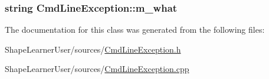 \subsubsection[{m\+\_\+what}]{\setlength{\rightskip}{0pt plus 5cm}string Cmd\+Line\+Exception\+::m\+\_\+what\hspace{0.3cm}{\ttfamily [private]}}\label{class_cmd_line_exception_a7b2c261df1b39eeda27b8ecda39aedb9}


The documentation for this class was generated from the following files\+:\begin{DoxyCompactItemize}
\item 
Shape\+Learner\+User/sources/\hyperlink{_cmd_line_exception_8h}{Cmd\+Line\+Exception.\+h}\item 
Shape\+Learner\+User/sources/\hyperlink{_cmd_line_exception_8cpp}{Cmd\+Line\+Exception.\+cpp}\end{DoxyCompactItemize}
